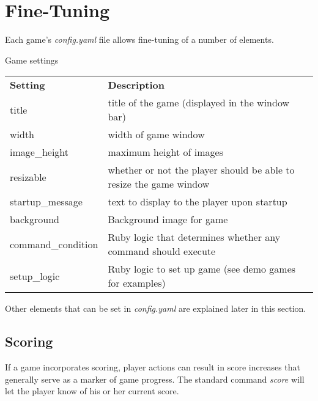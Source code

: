 \documentclass[letterpaper,10pt,english]{sphinxmanual}
\begin{document}
\chapter{Fine-Tuning}
\label{fine_tuning::doc}\label{fine_tuning:fine-tuning}
Each game's \emph{config.yaml} file allows fine-tuning of a number of elements.

\begin{threeparttable}
\capstart\caption{Game settings}

\begin{tabulary}{\linewidth}{|L|L|}
\hline

\textbf{Setting}
 & 
\textbf{Description}
\\

title
 & 
title of the game (displayed in the window bar)
\\

width
 & 
width of game window
\\

image\_height
 & 
maximum height of images
\\

resizable
 & 
whether or not the player should be able to resize the game window
\\

startup\_message
 & 
text to display to the player upon startup
\\

background
 & 
Background image for game
\\

command\_condition
 & 
Ruby logic that determines whether any command should execute
\\

setup\_logic
 & 
Ruby logic to set up game (see demo games for examples)
\\
\hline
\end{tabulary}

\end{threeparttable}


Other elements that can be set in \emph{config.yaml} are explained later in this section.


\section{Scoring}
\label{fine_tuning:scoring}
If a game incorporates scoring, player actions can result in score increases that generally serve as a marker of game progress. The standard command \emph{score} will let the player know of his or her current score.
\end{document}

